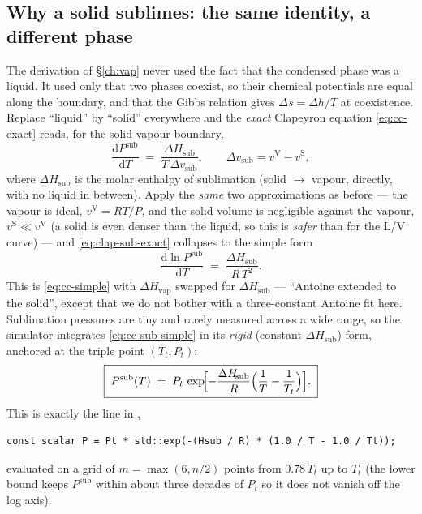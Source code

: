 \documentclass[11pt,a4paper]{article}
\newcommand{\Hvap}{\Delta H_{\!\mathrm{vap}}}
\newcommand{\Hsub}{\Delta H_{\!\mathrm{sub}}}
\begin{document}
\subsection{Why a solid sublimes: the same identity, a different phase}

The derivation of \S\ref{ch:vap} never used the fact that the
condensed phase was a liquid.  It used only that two phases coexist,
so their chemical potentials are equal along the boundary, and that
the Gibbs relation gives $\Delta s = \Delta h / T$ at coexistence.
Replace ``liquid'' by ``solid'' everywhere and the \emph{exact}
Clapeyron equation \eqref{eq:cc-exact} reads, for the solid-vapour
boundary,
\begin{equation}
   \frac{\mathrm{d}P^{\mathrm{sub}}}{\mathrm{d}T}
   \;=\; \frac{\Hsub}{T\,\Delta v_{\mathrm{sub}}},
   \qquad
   \Delta v_{\mathrm{sub}} = v^{\mathrm{V}} - v^{\mathrm{S}},
   \label{eq:clap-sub-exact}
\end{equation}
where $\Hsub$ is the molar enthalpy of sublimation (solid $\to$
vapour, directly, with no liquid in between).  Apply the \emph{same}
two approximations as before --- the vapour is ideal,
$v^{\mathrm{V}}=RT/P$, and the solid volume is negligible against the
vapour, $v^{\mathrm{S}}\ll v^{\mathrm{V}}$ (a solid is even denser
than the liquid, so this is \emph{safer} than for the L/V curve) ---
and \eqref{eq:clap-sub-exact} collapses to the simple form
\begin{equation}
   \frac{\mathrm{d}\ln P^{\mathrm{sub}}}{\mathrm{d}T}
   \;=\; \frac{\Hsub}{R\,T^{2}} .
   \label{eq:cc-sub-simple}
\end{equation}
This is \eqref{eq:cc-simple} with $\Hvap$ swapped for $\Hsub$ ---
``Antoine extended to the solid'', except that we do not bother with a
three-constant Antoine fit here.  Sublimation pressures are tiny and
rarely measured across a wide range, so the simulator integrates
\eqref{eq:cc-sub-simple} in its \emph{rigid} (constant-$\Hsub$) form,
anchored at the triple point $(T_t, P_t)$:
\begin{equation}
   \boxed{\;
   P^{\mathrm{sub}}(T) \;=\;
   P_t \,\exp\!\Bigl[-\frac{\Hsub}{R}
        \Bigl(\frac{1}{T}-\frac{1}{T_t}\Bigr)\Bigr] .
   \;}
   \label{eq:psub}
\end{equation}
This is exactly the line in ,
\begin{lstlisting}
const scalar P = Pt * std::exp(-(Hsub / R) * (1.0 / T - 1.0 / Tt));
\end{lstlisting}
evaluated on a grid of $m=\max(6,n/2)$ points from $0.78\,T_t$ up to
$T_t$ (the lower bound keeps $P^{\mathrm{sub}}$ within about three
decades of $P_t$ so it does not vanish off the log axis).
\end{document}
